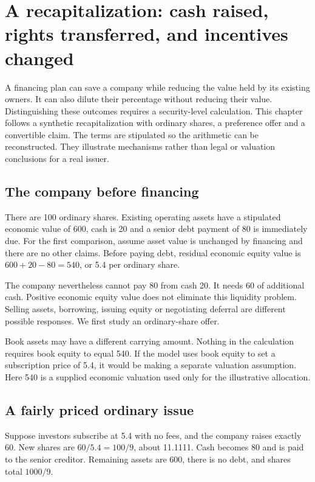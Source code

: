 \chapter[A recapitalization and its owners]{A recapitalization: cash raised, rights transferred, and incentives changed}
\label{sim:ownership-case}

A financing plan can save a company while reducing the value held by its existing owners. It can also dilute their percentage without reducing their value. Distinguishing these outcomes requires a security-level calculation. This chapter follows a synthetic recapitalization with ordinary shares, a preference offer and a convertible claim. The terms are stipulated so the arithmetic can be reconstructed. They illustrate mechanisms rather than legal or valuation conclusions for a real issuer.

\section{The company before financing}
There are 100 ordinary shares. Existing operating assets have a stipulated economic value of 600, cash is 20 and a senior debt payment of 80 is immediately due. For the first comparison, assume asset value is unchanged by financing and there are no other claims. Before paying debt, residual economic equity value is $600+20-80=540$, or 5.4 per ordinary share.

The company nevertheless cannot pay 80 from cash 20. It needs 60 of additional cash. Positive economic equity value does not eliminate this liquidity problem. Selling assets, borrowing, issuing equity or negotiating deferral are different possible responses. We first study an ordinary-share offer.

Book assets may have a different carrying amount. Nothing in the calculation requires book equity to equal 540. If the model uses book equity to set a subscription price of 5.4, it would be making a separate valuation assumption. Here 540 is a supplied economic valuation used only for the illustrative allocation.

\section{A fairly priced ordinary issue}
Suppose investors subscribe at 5.4 with no fees, and the company raises exactly 60. New shares are $60/5.4=100/9$, about 11.1111. Cash becomes 80 and is paid to the senior creditor. Remaining assets are 600, there is no debt, and shares total $1000/9$.

